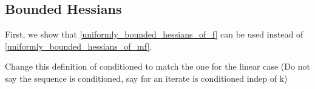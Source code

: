 \subsection{Bounded Hessians}
\label{simpler_h3}
First, we show that \cref{uniformly_bounded_hessians_of_f} can be used instead of \cref{uniformly_bounded_hessians_of_mf}.
% 
% 




\begin{boxedcomment}
Change this definition of conditioned to match the one for the linear case (Do not say the sequence is conditioned, say for an iterate is conditioned indep of k)
\end{boxedcomment}


